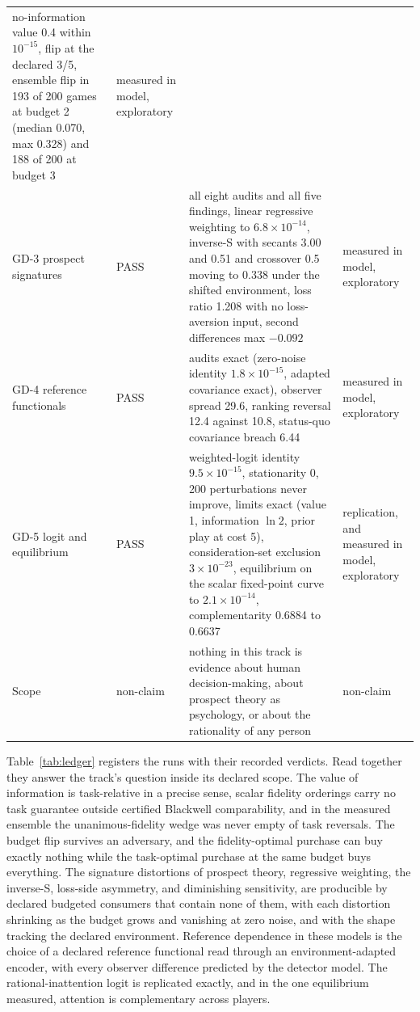 \documentclass[aps,pre,reprint,nofootinbib]{revtex4-2}
\begin{document}
\begin{table}[t]
\begin{ruledtabular}
\begin{tabular}{L{2.6cm}lL{9.6cm}L{2.9cm}}
no-information value 0.4 within $10^{-15}$, flip at the declared
3/5, ensemble flip in 193 of 200
games at budget 2 (median 0.070, max 0.328) and 188 of 200 at budget
3 & measured in model, exploratory \\
GD-3 prospect signatures & PASS & all eight audits and all five
findings, linear regressive weighting to $6.8\times10^{-14}$,
inverse-S with secants 3.00 and 0.51 and crossover 0.5 moving to
0.338 under the shifted environment, loss ratio 1.208 with no
loss-aversion input, second differences max $-0.092$ &
measured in model, exploratory \\
GD-4 reference functionals & PASS & audits exact (zero-noise
identity $1.8\times10^{-15}$, adapted covariance exact), observer
spread 29.6, ranking reversal 12.4 against 10.8, status-quo
covariance breach 6.44 & measured in model, exploratory \\
GD-5 logit and equilibrium & PASS & weighted-logit identity
$9.5\times10^{-15}$, stationarity 0, 200 perturbations never
improve, limits exact (value 1, information $\ln 2$, prior play at
cost 5), consideration-set exclusion $3\times10^{-23}$, equilibrium
on the scalar fixed-point curve to $2.1\times10^{-14}$,
complementarity 0.6884 to 0.6637 & replication, and measured in
model, exploratory \\
Scope & non-claim & nothing in this track is evidence about human
decision-making, about prospect theory as psychology, or about the
rationality of any person & non-claim \\
\end{tabular}
\end{ruledtabular}
\end{table}

Table~\ref{tab:ledger} registers the runs with their recorded
verdicts.  Read together they answer the track's question inside its
declared scope.  The value of information is task-relative in a
precise sense, scalar fidelity orderings carry no task guarantee
outside certified Blackwell comparability, and in the measured
ensemble the unanimous-fidelity wedge was never empty of task
reversals.  The budget flip survives an adversary, and the
fidelity-optimal purchase can buy exactly nothing while the
task-optimal purchase at the same budget buys everything.  The
signature distortions of prospect theory, regressive weighting, the
inverse-S, loss-side asymmetry, and diminishing sensitivity, are
producible by declared budgeted consumers that contain none of them,
with each distortion shrinking as the budget grows and vanishing at
zero noise, and with the shape tracking the declared environment.
Reference dependence in these models is the choice of a declared
reference functional read through an environment-adapted encoder,
with every observer difference predicted by the detector model.  The
rational-inattention logit is replicated exactly, and in the one
equilibrium measured, attention is complementary across players.
\end{document}
